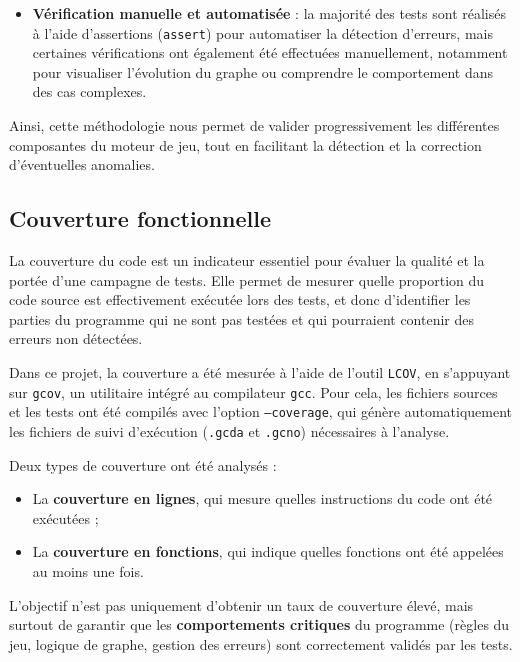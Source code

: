 \begin{itemize}
Ces tests sont indispensables pour anticiper les comportements erronés dans des situations peu fréquentes mais critiques, qui pourraient compromettre le déroulement d’une partie.

    
    \item \textbf{Vérification manuelle et automatisée} : la majorité des tests sont réalisés à l’aide d’assertions (\texttt{assert}) pour automatiser la détection d’erreurs, mais certaines vérifications ont également été effectuées manuellement, notamment pour visualiser l’évolution du graphe ou comprendre le comportement dans des cas complexes.
\end{itemize}

Ainsi, cette méthodologie nous permet de valider progressivement les différentes composantes du moteur de jeu, tout en facilitant la détection et la correction d’éventuelles anomalies.

\subsection{Couverture fonctionnelle}

La couverture du code est un indicateur essentiel pour évaluer la qualité et la portée d’une campagne de tests. Elle permet de mesurer quelle proportion du code source est effectivement exécutée lors des tests, et donc d’identifier les parties du programme qui ne sont pas testées et qui pourraient contenir des erreurs non détectées.

Dans ce projet, la couverture a été mesurée à l’aide de l’outil \texttt{LCOV}, en s’appuyant sur \texttt{gcov}, un utilitaire intégré au compilateur \texttt{gcc}. Pour cela, les fichiers sources et les tests ont été compilés avec l’option \texttt{--coverage}, qui génère automatiquement les fichiers de suivi d’exécution (\texttt{.gcda} et \texttt{.gcno}) nécessaires à l’analyse.

Deux types de couverture ont été analysés :

\begin{itemize}
    \item La \textbf{couverture en lignes}, qui mesure quelles instructions du code ont été exécutées ;
    \item La \textbf{couverture en fonctions}, qui indique quelles fonctions ont été appelées au moins une fois.
\end{itemize}

L’objectif n’est pas uniquement d’obtenir un taux de couverture élevé, mais surtout de garantir que les \textbf{comportements critiques} du programme (règles du jeu, logique de graphe, gestion des erreurs) sont correctement validés par les tests.

